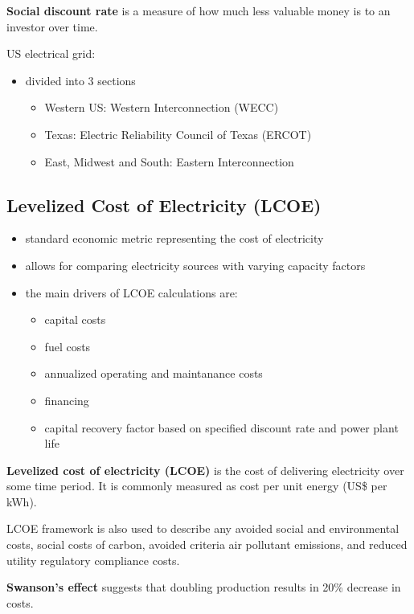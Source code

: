 \textbf{Social discount rate} is a measure of how much less valuable money is
to an investor over time.

US electrical grid:
\begin{itemize}
	\item divided into 3 sections
	\begin{itemize}
		\item Western US: Western Interconnection (WECC)
		\item Texas: Electric Reliability Council of Texas (ERCOT)
		\item East, Midwest and South: Eastern Interconnection
	\end{itemize}
\end{itemize}

\subsection{Levelized Cost of Electricity (LCOE)}

\begin{itemize}
	\item standard economic metric representing the cost of electricity
	\item allows for comparing electricity sources with varying capacity
	factors
	\item the main drivers of LCOE calculations are:
	\begin{itemize}
		\item capital costs
		\item fuel costs
		\item annualized operating and maintanance costs
		\item financing
		\item capital recovery factor based on specified discount rate
		and power plant life
	\end{itemize}
\end{itemize}

\textbf{Levelized cost of electricity (LCOE)} is the cost of delivering
electricity over some time period. It is commonly measured as cost per unit
energy (US\$ per kWh).

LCOE framework is also used to describe any avoided social and environmental
costs, social costs of carbon, avoided criteria air pollutant emissions, and
reduced utility regulatory compliance costs.

\textbf{Swanson's effect} suggests that doubling production results in
20\% decrease in costs.

